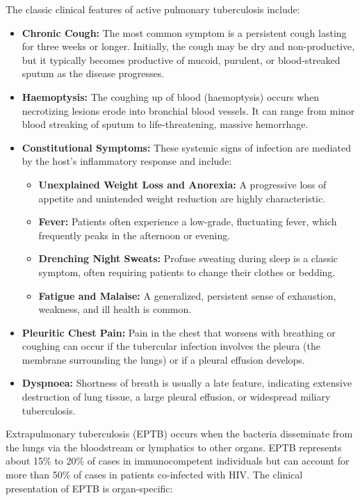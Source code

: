 The classic clinical features of active pulmonary tuberculosis include:

\begin{itemize}
    \item \textbf{Chronic Cough:} The most common symptom is a persistent cough lasting for three weeks or longer. Initially, the cough may be dry and non-productive, but it typically becomes productive of mucoid, purulent, or blood-streaked sputum as the disease progresses.
    \item \textbf{Haemoptysis:} The coughing up of blood (haemoptysis) occurs when necrotizing lesions erode into bronchial blood vessels. It can range from minor blood streaking of sputum to life-threatening, massive hemorrhage.
    \item \textbf{Constitutional Symptoms:} These systemic signs of infection are mediated by the host's inflammatory response and include:
    \begin{itemize}
        \item \textbf{Unexplained Weight Loss and Anorexia:} A progressive loss of appetite and unintended weight reduction are highly characteristic.
        \item \textbf{Fever:} Patients often experience a low-grade, fluctuating fever, which frequently peaks in the afternoon or evening.
        \item \textbf{Drenching Night Sweats:} Profuse sweating during sleep is a classic symptom, often requiring patients to change their clothes or bedding.
        \item \textbf{Fatigue and Malaise:} A generalized, persistent sense of exhaustion, weakness, and ill health is common.
    \end{itemize}
    \item \textbf{Pleuritic Chest Pain:} Pain in the chest that worsens with breathing or coughing can occur if the tubercular infection involves the pleura (the membrane surrounding the lungs) or if a pleural effusion develops.
    \item \textbf{Dyspnoea:} Shortness of breath is usually a late feature, indicating extensive destruction of lung tissue, a large pleural effusion, or widespread miliary tuberculosis.
\end{itemize}

Extrapulmonary tuberculosis (EPTB) occurs when the bacteria disseminate from the lungs via the bloodstream or lymphatics to other organs. EPTB represents about 15\% to 20\% of cases in immunocompetent individuals but can account for more than 50\% of cases in patients co-infected with HIV. The clinical presentation of EPTB is organ-specific:

